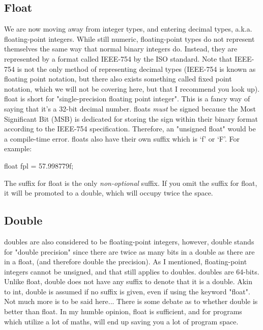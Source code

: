 \documentclass{article}
\begin{document}
\subsection{Float}

We are now moving away from integer types, and entering decimal types, a.k.a. floating-point integers. While
still numeric, floating-point types do not represent themselves the same way that normal binary integers do.
Instead, they are represented by a format called IEEE-754 by the ISO standard. Note that IEEE-754 is not the
only method of representing decimal types (IEEE-754 is known as floating point notation, but there also exists
something called fixed point notation, which we will not be covering here, but that I recommend you look up).
float is short for "single-precision floating point integer". This is a fancy way of saying that it’s a 32-bit
decimal number. floats \textit{must} be signed because the Most Significant Bit (MSB) is dedicated for storing
the sign within their binary format according to the IEEE-754 specification. Therefore, an "unsigned float"
would be a compile-time error. floats also have their own suffix which is ‘f’ or ‘F’. For example:

\begin{clst}
float fpl = 57.998779f;
\end{clst}

The suffix for float is the only \textit{non-optional} suffix. If you omit the suffix for float, it will be
promoted to a double, which will occupy twice the space.

\subsection{Double}

doubles are also considered to be floating-point integers, however, double stands for "double precision" since
there are twice as many bits in a double as there are in a float, (and therefore double the precision). As I
mentioned, floating-point integers cannot be unsigned, and that still applies to doubles. doubles are 64-bits.
Unlike float, double does not have any suffix to denote that it is a double. Akin to int, double is assumed if
no suffix is given, even if using the keyword "float". Not much more is to be said here... There is some debate
as to whether double is better than float. In my humble opinion, float is sufficient, and for programs which
utilize a lot of maths, will end up saving you a lot of program space.
\end{document}
